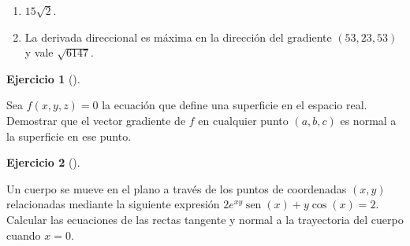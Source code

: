 \documentclass[
  a4paper,
]{scrreport}
\theoremstyle{definition}
\newtheorem{exercise}{Ejercicio}[chapter]
\theoremstyle{remark}
\begin{document}
\begin{tcolorbox}[enhanced jigsaw, toprule=.15mm, bottomrule=.15mm, coltitle=black, toptitle=1mm, breakable, left=2mm, arc=.35mm, title=\textcolor{quarto-callout-tip-color}{\faLightbulb}\hspace{0.5em}{Solución}, titlerule=0mm, colback=white, colbacktitle=quarto-callout-tip-color!10!white, colframe=quarto-callout-tip-color-frame, bottomtitle=1mm, rightrule=.15mm, leftrule=.75mm, opacitybacktitle=0.6, opacityback=0]

\begin{enumerate}
\def\labelenumi{\alph{enumi}.}
\item
  \(15\sqrt{2}\).
\item
  La derivada direccional es máxima en la dirección del gradiente
  \((53,23,53)\) y vale \(\sqrt{6147}\).
\end{enumerate}

\end{tcolorbox}

\begin{exercise}[]\protect\hypertarget{exr-vector-gradiente-normal-curvas-nivel}{}\label{exr-vector-gradiente-normal-curvas-nivel}

Sea \(f(x,y,z)=0\) la ecuación que define una superficie en el espacio
real. Demostrar que el vector gradiente de \(f\) en cualquier punto
\((a, b, c)\) es normal a la superficie en ese punto.

\end{exercise}

\begin{exercise}[]\protect\hypertarget{exr-derviada-implicita-trayectoria}{}\label{exr-derviada-implicita-trayectoria}

Un cuerpo se mueve en el plano a través de los puntos de coordenadas
\((x,y)\) relacionadas mediante la siguiente expresión
\(2e^{xy} \operatorname{sen}(x) + y\cos(x) = 2\). Calcular las
ecuaciones de las rectas tangente y normal a la trayectoria del cuerpo
cuando \(x=0\).

\end{exercise}
\end{document}
